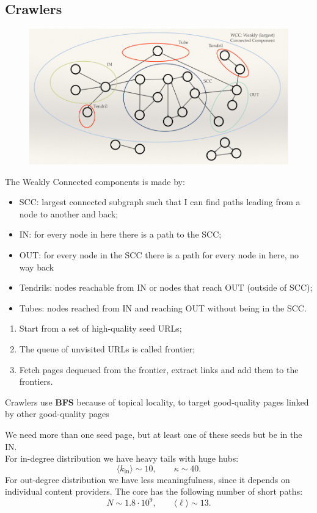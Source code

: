 \documentclass[a4paper,9pt]{extarticle}
\begin{document}
\begin{multicols*}{2}
		\subsection{Crawlers}
		\begin{figure}[H]
			\centering
			\includegraphics[width=0.7\linewidth]{screenshot003}
			\label{fig:screenshot003}
		\end{figure}
		The Weakly Connected components is made by:
		\begin{itemize}
			\item SCC: largest connected subgraph such that I can find paths leading from a node to another and back;
			\item IN: for every node in here there is a path to the SCC;
			\item OUT: for every node in the SCC there is a path for every node in here, no way back
			\item Tendrils: nodes reachable from IN or nodes that reach OUT (outside of SCC);
			\item Tubes: nodes reached from IN and reaching OUT without being in the SCC.
		\end{itemize}
		\begin{riquadro}
			\begin{enumerate}
				\item Start from a set of high-quality seed URLs;
				\item The queue of unvisited URLs is called frontier;
				\item Fetch pages dequeued from the frontier, extract links and add them to the frontiers.
			\end{enumerate}
			Crawlers use \textbf{BFS} because of topical
			locality, to target good-quality
			pages linked by other good-quality
			pages
		\end{riquadro}
		We need more than one seed page, but at least one of these seeds but be in the IN.\\
		For in-degree distribution we have heavy tails with huge hubs:
		\begin{equation*}
			\langle k_{\mathrm{in}}\rangle\sim10,\qquad\kappa\sim40.
		\end{equation*}
		For out-degree distribution we have less meaningfulness, since it depends on individual content providers. The core has the following number of short paths:
		\begin{equation*}
			N\sim1.8\cdot10^{9},\qquad\langle\ell\rangle\sim13.
		\end{equation*}

\end{multicols*}
\end{document}
